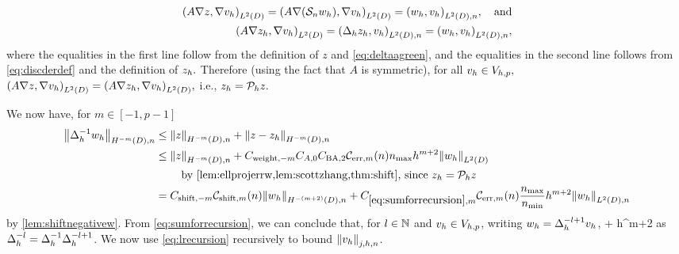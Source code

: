 \begin{align*}
\IPLtD{A \grad z}{\grad \vh} = \IPLtD{A \grad \mleft(\sdsol \wh\mright)}{\grad \vh} = \IPLtDn{\wh}{\vh},\quad \text{and}\\
\IPLtD{A \grad \zh}{\grad \vh} = \IPLtDn{\Deltah \zh}{\vh} = \IPLtDn{\wh}{\vh},
\end{align*}
where the equalities in the first line follow from the definition of $z$ and \cref{eq:deltaagreen}, and the equalities in the second line follows from \cref{eq:discderdef} and the definition of $z_{h}.$  Therefore (using the fact that $A$ is symmetric), for all $v_{h} \in V_{h,p},$ $\IPLtD{A\grad z}{\grad \vh} = \IPLtD{A\grad \zh}{\grad \vh},$ i.e., $z_{h} = \mathcal P_{h} z.$

We now have, for $m \in [-1,p-1]$
\begin{align}
\NHnfn{-m}{D}{\DeltahI \wh} &\leq \NHnfn{-m}{D}{z} + \NHnfn{-m}{D}{z-\zh}\nonumber\\
&\leq \NHnfn{-m}{D}{z} + \Cwfn{-m}  \CAfn{0} \CSZfn{2} \errn{m} \nmax h^{m+2} \NLtD{\wh}\nonumber\\
&\quad\quad\text{ by \cref{lem:ellprojerrw,lem:scottzhang,thm:shift}, since }\zh = \Ph z\nonumber\\
&= \Cshiftfn{m} \shiftn{m} \NHnfn{-(m+2)}{D}{\wh} + \Cm \errn{m} \frac{\nmax}{\nmin} h^{m+2} \NLtDn{\wh}\label{eq:sumforrecursion}
\end{align}
by \cref{lem:shiftnegativew}.
From \cref{eq:sumforrecursion}, we can conclude that, for $l \in \mathbb N$ and $v_{h} \in V_{h,p}$, writing $w_{h} = \Delta_{h}^{-l+1} v_{h}$,
\beq\label{eq:lrecursion}
 \leq {}  + \Cm {} \frac{\nmax}{\nmin} h^{m+2} \NLtDn{\Deltahmlpo \vh}
\eeq
as $\Delta_{h}^{-l} = \Delta_{h}^{-1} \Delta_{h}^{-l+1}$. We now use \cref{eq:lrecursion} recursively to bound $\Nfn{j,h,n}{\vh}$.

